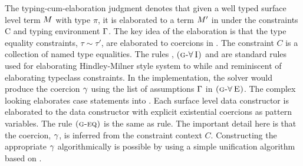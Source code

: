 \documentclass[screen,nonacm,manuscript,review]{acmart} %
\begin{document}
\newcommand\GADTVar{
 \ib{\irule[\trule{g-var}]
 {x\co\pi \in \TEnv};
 {\GTranslate C \TEnv x {\pi} x}
 }
}
\newcommand\GADTEq{
 \ib{\irule[\trule{g-eq}]
 {\GTranslate C \TEnv \Tm \tau \Tm'}
 {\CoKinding C \Co {\tau \sim \tau'}};
 {\GTranslate C \TEnv \Tm {\tau'} {\Cast {\Tm'} \Co}}
 }
}
\newcommand\GADTForallI{
 \ib{\irule[\trule{g-$\I\forall$}]
 {\GTranslate C \TEnv \Tm \pi \Tm'}
 {\fresh \TyVar {C, \TEnv}};
 {\GTranslate C \TEnv \Tm {\Forall {\TyVar\co\star} \pi} {\TLam {\TyVar\co\star} \Tm'}}
 }
}
\newcommand\GADTForallE{
 \ib{\irule[\trule{g-$\E\forall$}]
 {\GTranslate C \TEnv \Tm {\Forall {\TyVar\co\star} \pi} \Tm'};
 {\GTranslate C \TEnv \Tm {\Set{\TyVar\mapsto\tau}\pi} {\Tm'\App \tau}}
 }
}
\newcommand\GADTCI{
 \ib{\irule[\trule{g-$\I C$}]
 {\GTranslate {C,c:\tau\sim\tau'} \TEnv \Tm {\eta} \Tm'};
 {\GTranslate C \TEnv \Tm {\tau\sim\tau'\then\eta} {\TLam {(c\co\tau\sim\tau')} \Tm'}}
 }
}
\newcommand\GADTCE{
 \ib{\irule[\trule{g-$\E C$}]
 {\GTranslate {C} \TEnv \Tm {\tau\sim\tau'\then\eta} \Tm'}
 {\CoKinding C \Co \tau\sim\tau'};
 {\GTranslate C \TEnv \Tm {\eta} {\Tm'\App\Co}}
 }
}
\newcommand\GADTAlt{
 \ib{\irule[\trule{g-alt}]
 {\substack{
 \mathlarger{H\co \Forall {\many\TyVar} {\Forall {\many\beta} {\many{\tau'\sim\tau''} \then \many\tau \to T\many\TyVar}}}\quad
 \mathlarger{\many\TyVar \cap \many\beta = \varnothing}\quad
 \mathlarger{\fvs{\many\tau, \many{\tau'}, \many{\tau''}} = \fvs{\many\TyVar, \many\beta}}\quad
 \mathlarger{\Subst = \Set{\many{\TyVar\mapsto v}}}\quad
 \mathlarger{\fresh {\many{c}} {C, \TEnv}}\\
 \mathlarger{\GTranslate {C,\many{c\co\Subst{\tau'}\sim\Subst\tau''}\,} {\,\TEnv,\many{x\co\Subst\tau}\,} \Tm {\tau'} \Tm'} }};
 {\GTranslate C \TEnv {H\App\many x \to \Tm} {T\App\many v \to \tau'}
 {H\App(\many{\beta\co\star})\App(\many{c\co\Subst\tau'\sim\Subst\tau''})\App(\many{x\co\Subst\tau}) \to \Tm' }}
 }
}

The typing-cum-elaboration judgment
 denotes that given a well
typed surface level term $M$ with type $\pi$, it is elaborated to a
term $M'$ in \SFC under the constraints C and typing environment
$\Gamma$. The key idea of the elaboration is that the type equality
constraints, $\tau\sim\tau'$, are elaborated to coercions in \SFC. The
constraint $C$ is a collection of named type equalities. The rules
, $\textsc{(g-\ensuremath{\mathord{\forall}}\!~I)}$ and  are
standard rules used for elaborating Hindley-Milner style
system\cite{wadler_polymorphism_1989} to \SF while 
and  reminiscent of elaborating typeclass
constraints. In the implementation, the solver would produce the
coercion $\gamma$ using the list of assumptions $\Gamma$ in
$\textsc{(g-\ensuremath{\mathord{\forall}}\!~E)}$. The complex looking  elaborates
case statements into \SFC. Each surface level data constructor is
elaborated to the \SFC data constructor with explicit existential
coercions as pattern variables. The rule $\textsc{(g-eq)}$ is the same as
 rule. The important detail here is that the coercion,
$\gamma$, is inferred from the constraint context $C$. Constructing the
appropriate $\gamma$ algorithmically is possible by using a simple
unification algorithm based on \cite{lassez_unification_1988}.
\end{document}

